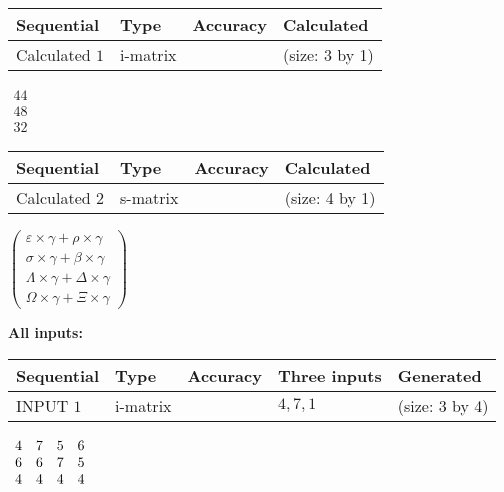 \documentclass[12pt]{article}
\begin{document}
   
  
  
\noindent\begin{tabular}{|l|l|l|l|}
\hline
 Sequential & Type & Accuracy & Calculated \\ 
\hline
 
 
  Calculated $           1$ & i-matrix &  & 
 (size:           3 by           1)
 \\  \hline  
 \end{tabular}
   
   
$\begin{array}{
 c
 }
          44 \\ 
          48 \\ 
          32
 \end{array}  $ 
  
  
\noindent\begin{tabular}{|l|l|l|l|}
\hline
 Sequential & Type & Accuracy & Calculated \\ 
\hline
 
 
  Calculated $           2$ & s-matrix & & 
 (size:           4 by           1)
 \\  \hline  
 \end{tabular}
   
   
 $   \left( \begin{array}
 {
 c
 }
 \varepsilon \times  \gamma   +  \rho \times  \gamma \\ 
 \sigma \times  \gamma   +  \beta \times  \gamma \\ 
 \Lambda \times  \gamma   +  \Delta \times  \gamma \\ 
 \Omega \times  \gamma   +                     \Xi \times  \gamma
 \end{array} \right) $ 
   
   
\noindent\vspace{0.1in}\hspace{-0.08in} {\textbf{\Large{All inputs: }}}
   
   
  
  
\noindent\begin{tabular}{|l|l|l|l|l|}
\hline
 Sequential & Type & Accuracy & Three inputs & Generated \\ 
\hline
 
 
  INPUT $           1$ & i-matrix &  & $
 4
 , 
 7
 , 
 1
 $ & (size:           3 by           4)
 \\  \hline  
 \end{tabular}
   
   
 $\begin{array}{
 c
 c
 c
 c
 }
           4 & 
           7 & 
           5 & 
           6 \\ 
           6 & 
           6 & 
           7 & 
           5 \\ 
           4 & 
           4 & 
           4 & 
           4
\end{array}  $ 
  
\end{document}
